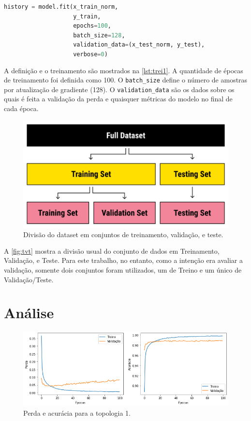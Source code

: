 \documentclass[sigconf, nonacm, screen]{acmart}
\begin{document}
\begin{lstlisting}[language=Python,label=lst:trei1,caption={Topologia 1 - treinamento do modelo}]
history = model.fit(x_train_norm,
                    y_train,
                    epochs=100,
                    batch_size=128,
                    validation_data=(x_test_norm, y_test),
                    verbose=0)
\end{lstlisting}

A definição e o treinamento são mostrados na \autoref{lst:trei1}. A quantidade de épocas de treinamento foi definida como 100. O \texttt{batch\_size} define o número de amostras por atualização de gradiente (128). O \texttt{validation\_data} são os dados sobre os quais é feita a validação da perda e quaisquer métricas do modelo no final de cada época.

\begin{figure}[ht]
	\centering
	\includegraphics[width=0.9\linewidth]{img/trai-vali-test}
	\caption{Divisão do dataset em conjuntos de treinamento, validação, e teste.}
	\label{fig:tvt}
\end{figure}

A \autoref{fig:tvt} mostra a divisão usual do conjunto de dados em Treinamento, Validação, e Teste. Para este trabalho, no entanto, como a intenção era avaliar a validação, somente dois conjuntos foram utilizados, um de Treino e um único de Validação/Teste.





\section{Análise}
\label{sec:analise}

\begin{figure}[ht]
	\centering
	\includegraphics[width=\linewidth]{img/perd_acur_1}
	\caption{Perda e acurácia para a topologia 1.}
	\label{fig:perdacur1}
\end{figure}
\end{document}
